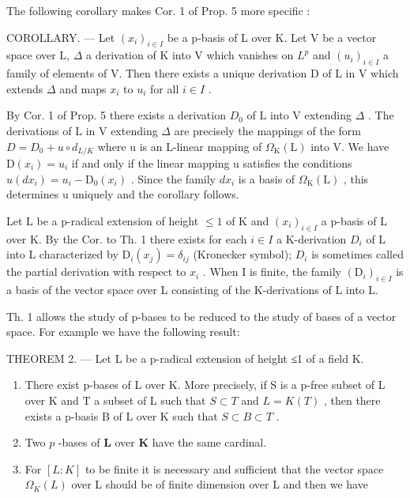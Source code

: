 The following corollary makes Cor. 1 of Prop. 5 more specific :

COROLLARY. --- Let \((x_{i})_{i\in I}\) be a p-basis of L over K. Let V be a vector space over L, \(\Delta\) a derivation of K into V which vanishes on \(L^{p}\) and \((u_{i})_{i\in I}\) a family of elements of V. Then there exists a unique derivation D of L in V which extends \(\Delta\) and maps \(x_{i}\) to \(u_{i}\) for all \(i\in I\) .

By Cor. 1 of Prop. 5 there exists a derivation \(D_{0}\) of L into V extending \(\Delta\) . The derivations of L in V extending \(\Delta\) are precisely the mappings of the form \(D = D_{0} + u \circ d_{L/K}\) where u is an L-linear mapping of \(\Omega_{\mathrm{K}}(\mathrm{L})\) into V. We have \(\mathrm{D}(x_{i}) = u_{i}\) if and only if the linear mapping u satisfies the conditions \(u(dx_{i}) = u_{i} - \mathrm{D}_{0}(x_{i})\) . Since the family \(dx_{i}\) is a basis of \(\Omega_{\mathrm{K}}(\mathrm{L})\) , this determines u uniquely and the corollary follows.

Let L be a p-radical extension of height \(\leqslant1\) of K and \((x_{i})_{i\in I}\) a p-basis of L over K. By the Cor. to Th. 1 there exists for each \(i\in I\) a K-derivation \(D_{i}\) of L into L characterized by \(\mathrm{D}_{i}(x_{j})=\delta_{ij}\) (Kronecker symbol); \(D_{i}\) is sometimes called the partial derivation with respect to \(x_{i}\) . When I is finite, the family \((\mathrm{D}_{i})_{i\in I}\) is a basis of the vector space over L consisting of the K-derivations of L into L.

Th. 1 allows the study of p-bases to be reduced to the study of bases of a vector space. For example we have the following result:

THEOREM 2. --- Let L be a p-radical extension of height ≤1 of a field K.

\begin{enumerate}
\def\labelenumi{\alph{enumi})}
\item
  There exist p-bases of L over K. More precisely, if S is a p-free subset of L over K and T a subset of L such that \(S \subset T\) and \(L = K(T)\) , then there exists a p-basis B of L over K such that \(S \subset B \subset T\) .
\item
  Two \(p\) -bases of \(\mathbf{L}\) over \(\mathbf{K}\) have the same cardinal.
\item
  For \([L:K]\) to be finite it is necessary and sufficient that the vector space \(\Omega_{K}(L)\) over L should be of finite dimension over L and then we have
\end{enumerate}

